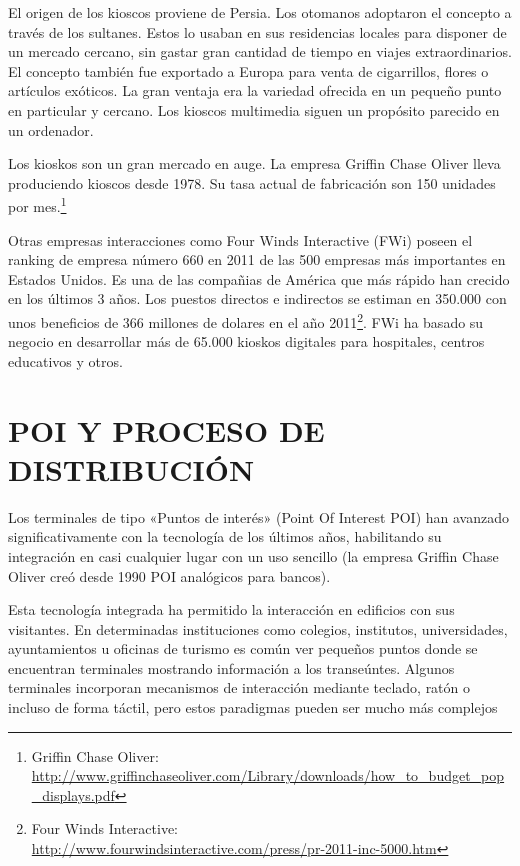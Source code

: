 El origen de los kioscos proviene de Persia. Los otomanos adoptaron el
concepto a través de los sultanes. Estos lo usaban en sus residencias locales
para disponer de un mercado cercano, sin gastar gran cantidad de tiempo en
viajes extraordinarios. El concepto también fue exportado a Europa para venta de
cigarrillos, flores o artículos exóticos. La gran ventaja era la variedad
ofrecida en un pequeño punto en particular y cercano. Los kioscos multimedia
siguen un propósito parecido en un ordenador.

Los kioskos son un gran mercado en auge. La empresa Griffin Chase Oliver lleva
produciendo kioscos desde 1978. Su tasa actual de fabricación son 150 
unidades por mes.\footnote{Griffin Chase Oliver:\\
\url{http://www.griffinchaseoliver.com/Library/downloads/how_to_budget_pop_displays.pdf}\label{ftn:Griffin}}

Otras empresas interacciones como Four Winds Interactive (FWi) poseen el ranking
de empresa número 660 en 2011 de las 500 empresas más importantes en Estados
Unidos. Es una de las compañias de América que más rápido han crecido en los
últimos 3 años. Los puestos directos e indirectos se estiman en 350.000 con unos
beneficios de 366 millones de dolares en el año 2011\footnote{Four Winds
Interactive:\\
\url{http://www.fourwindsinteractive.com/press/pr-2011-inc-5000.htm}\label{ftn:Griffin}}. FWi ha basado su negocio
en desarrollar más de 65.000 kioskos digitales para hospitales, centros
educativos y otros.

\section{\uppercase{POI y proceso de distribución}}
\label{sec:distributionaccesspoi}

Los terminales de tipo «Puntos de interés» (Point Of Interest \acs{POI}) han
avanzado significativamente con la tecnología de los últimos años, habilitando 
su integración en casi cualquier lugar con un uso sencillo (la empresa Griffin
Chase Oliver creó desde 1990 POI analógicos para bancos).

Esta tecnología integrada ha permitido la interacción en edificios con sus
visitantes. En determinadas instituciones como colegios, institutos,
universidades, ayuntamientos u oficinas de turismo es común ver pequeños 
puntos donde se
encuentran terminales mostrando información a los transeúntes. Algunos
terminales incorporan mecanismos de interacción mediante teclado, ratón o
incluso de forma táctil, pero estos paradigmas pueden ser mucho más complejos


